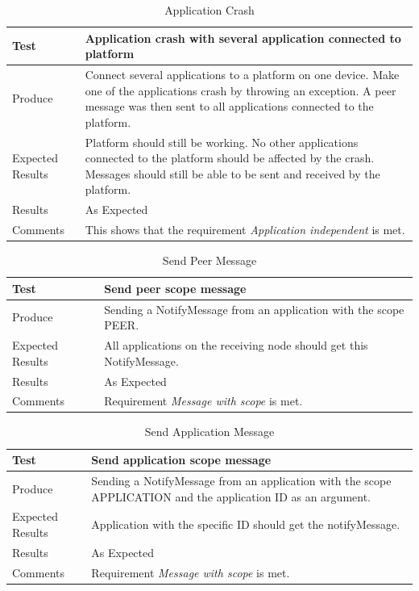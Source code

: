 \begin{table}[!h]
    \begin{tabular}{ | l | p{12cm} |}
    \hline
    Test 	 				& 		 Application crash with several application connected to platform\\ \hline
	Produce  				& 		 Connect several applications to a platform on one device. Make one of the applications crash by throwing an exception. A peer message was then sent to all applications connected to the platform.\\ \hline
	Expected Results  		& 		 Platform should still be working. No other applications connected to the platform should be affected by the crash. Messages should still be able to be sent and received by the platform.\\ \hline
	Results 				& 		 As Expected\\ \hline
	Comments				& 		 This shows that the requirement \emph{Application independent} is met.\\ \hline
    \end{tabular}
    \caption{Application Crash}
\end{table}

\begin{table}[!h]
    \begin{tabular}{ | l | p{12cm} |}
    \hline
    Test 	 				& 		 Send peer scope message\\ \hline
	Produce  				& 		 Sending a NotifyMessage from an application with the scope PEER. \\ \hline
	Expected Results  		& 		 All applications on the receiving node should get this NotifyMessage.\\ \hline
	Results 				& 		 As Expected\\ \hline
	Comments				& 		 Requirement \emph{Message with scope} is met.\\ \hline
    \end{tabular}
    \caption{Send Peer Message}
\end{table}

\begin{table}[!h]
    \begin{tabular}{ | l | p{12cm} |}
    \hline
    Test 	 				& 		 Send application scope message\\ \hline
	Produce  				& 		 Sending a NotifyMessage from an application with the scope APPLICATION and the application ID as an argument. \\ \hline
	Expected Results  		& 		 Application with the specific ID should get the notifyMessage. \\ \hline
	Results 				& 		 As Expected\\ \hline
	Comments				& 		 Requirement \emph{Message with scope} is met.\\ \hline
    \end{tabular}
    \caption{Send Application Message}
\end{table}


